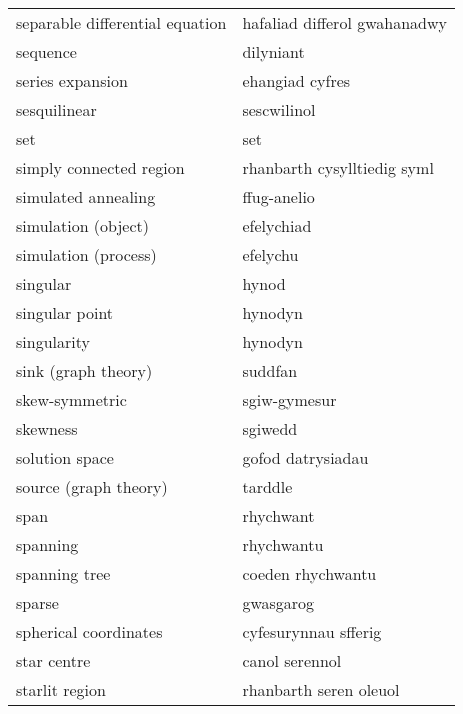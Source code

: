 \begin{supertabular}{p{0.22\textwidth}p{0.22\textwidth}}
 separable differential equation &    hafaliad differol gwahanadwy \\
                        sequence &                       dilyniant \\
                series expansion &                 ehangiad cyfres \\
                    sesquilinear &                     sescwilinol \\
                             set &                             set \\
         simply connected region &     rhanbarth cysylltiedig syml \\
             simulated annealing &                     ffug-anelio \\
             simulation (object) &                      efelychiad \\
            simulation (process) &                        efelychu \\
                        singular &                           hynod \\
                  singular point &                         hynodyn \\
                     singularity &                         hynodyn \\
             sink (graph theory) &                         suddfan \\
                  skew-symmetric &                    sgiw-gymesur \\
                        skewness &                         sgiwedd \\
                  solution space &               gofod datrysiadau \\
           source (graph theory) &                         tarddle \\
                            span &                       rhychwant \\
                        spanning &                      rhychwantu \\
                   spanning tree &               coeden rhychwantu \\
                          sparse &                       gwasgarog \\
           spherical coordinates &            cyfesurynnau sfferig \\
                     star centre &                  canol serennol \\
                  starlit region &          rhanbarth seren oleuol \\

\end{supertabular}
